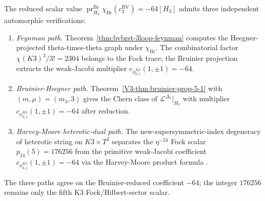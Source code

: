 \begin{remark}
\label{rem:bvbrst-3loop-multipath}
The reduced scalar value
\(\operatorname{pr}_{H_3}^{\mathrm{Br}}
\chi_{\mathrm{Br}}(c_3^{\mathrm{BV}})=-64[H_3]\) admits three
independent automorphic verifications:
\begin{enumerate}[leftmargin=1.8em]
\item \emph{Feynman path.} Theorem~\ref{thm:bvbrst-3loop-feynman}
 computes the Heegner-projected theta-times-theta graph under
 \(\chi_{\mathrm{Br}}\). The
 combinatorial factor $\chi(K3)^3/3!=2304$ belongs to the Fock trace;
 the Bruinier projection extracts the weak-Jacobi multiplier
 \(c_{\phi_{0,1}^{K3}}(1,\pm1)=-64\).
\item \emph{Bruinier-Heegner path.} Theorem~\ref{V3-thm:bruinier-prop-5-1}
 with $(m,\mu)=(m_3,3)$ gives the Chern class of
 $\mathcal{L}^{\Delta_5}\big|_{H_3}$ with multiplier
 \(c_{\phi_{0,1}^{K3}}(1,\pm1)=-64\) after reduction.
\item \emph{Harvey-Moore heterotic-dual path.}
 The new-supersymmetric-index degeneracy of heterotic string on
 $K3\times T^2$ separates the $\eta^{-24}$ Fock scalar
 $p_{24}(5)=176256$ from the primitive weak-Jacobi coefficient
 \(c_{\phi_{0,1}^{K3}}(1,\pm1)=-64\) via the Harvey-Moore product formula
 \cite[\S 4]{HarveyMoore1996}.
\end{enumerate}
The three paths agree on the Bruinier-reduced coefficient \(-64\); the
integer $176256$ remains only the fifth K3 Fock/Hilbert-sector scalar.
\end{remark}

